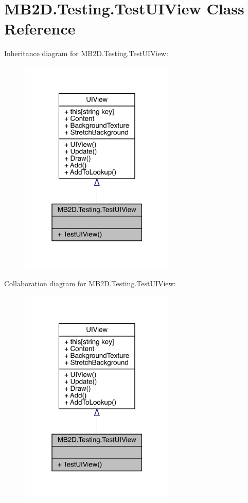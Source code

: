 \hypertarget{class_m_b2_d_1_1_testing_1_1_test_u_i_view}{}\section{M\+B2\+D.\+Testing.\+Test\+U\+I\+View Class Reference}
\label{class_m_b2_d_1_1_testing_1_1_test_u_i_view}


Inheritance diagram for M\+B2\+D.\+Testing.\+Test\+U\+I\+View\+:
\nopagebreak
\begin{figure}[H]
\begin{center}
\leavevmode
\includegraphics[width=211pt]{class_m_b2_d_1_1_testing_1_1_test_u_i_view__inherit__graph}
\end{center}
\end{figure}


Collaboration diagram for M\+B2\+D.\+Testing.\+Test\+U\+I\+View\+:
\nopagebreak
\begin{figure}[H]
\begin{center}
\leavevmode
\includegraphics[width=211pt]{class_m_b2_d_1_1_testing_1_1_test_u_i_view__coll__graph}
\end{center}
\end{figure}
